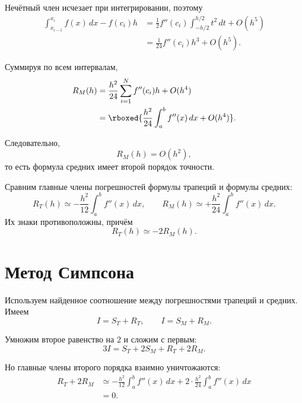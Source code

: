 \documentclass[../final.tex]{subfiles}
\begin{document}
Нечётный член исчезает при интегрировании, поэтому
%
\begin{align*}
    \int_{x_{i-1}}^{x_i}f(x)\,dx-f(c_i)h
    &=
    \frac12 f''(c_i)
    \int_{-h/2}^{h/2}t^2\,dt
    +O(h^5)\\
    &=
    \frac1{24}f''(c_i)h^3
    +O(h^5).
\end{align*}

Суммируя по всем интервалам,
%
\begin{align*}
    R_M(h)
    &=
    \frac{h^2}{24}
    \sum_{i=1}^{N}f''(c_i)h
    +O(h^4)\\
    &=
    \rboxed{
    \frac{h^2}{24}\int_a^b f''(x)\,dx
    +O(h^4)
    }.
\end{align*}

Следовательно,
%
\begin{equation*}
    R_M(h)=O(h^2),
\end{equation*}
%
то есть формула средних имеет второй порядок точности.

Сравним главные члены погрешностей формулы трапеций и формулы средних:
%
\begin{equation*}
    R_T(h)
    \simeq
    -\frac{h^2}{12}\int_a^b f''(x)\,dx,
    \qquad
    R_M(h)
    \simeq
    +\frac{h^2}{24}\int_a^b f''(x)\,dx.
\end{equation*}
%
Их знаки противоположны, причём
%
\begin{equation*}
    R_T(h)\simeq -2R_M(h).
\end{equation*}


\section{Метод Симпсона}

Используем найденное соотношение между погрешностями трапеций и
средних. Имеем
%
\begin{equation*}
    I=S_T+R_T,
    \qquad
    I=S_M+R_M.
\end{equation*}

Умножим второе равенство на $2$ и сложим с первым:
%
\begin{equation*}
    3I
    =
    S_T+2S_M+R_T+2R_M.
\end{equation*}

Но главные члены второго порядка взаимно уничтожаются:
%
\begin{align*}
    R_T+2R_M
    &\simeq
    -\frac{h^2}{12}\int_a^b f''(x)\,dx
    +2\cdot\frac{h^2}{24}\int_a^b f''(x)\,dx\\
    &=0.
\end{align*}
\end{document}
